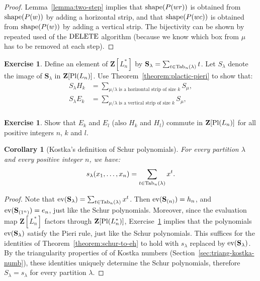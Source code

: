\documentclass[11pt]{amsproc}
\newtheorem{corollary}[theorem]{Corollary}
\theoremstyle{definition}
\theoremstyle{example}
\newtheorem{exercise}[theorem]{Exercise}
\newcommand{\ev}{\textup{ev}}
\newcommand{\del}{\textup{DELETE}}
\newcommand{\pl}{\textup{Pl}}
\newcommand{\shape}{\textup{shape}}
\newcommand{\Tab}{\textup{Tab}}
\begin{document}
\begin{proof}
  Lemma~\ref{lemma:two-step} implies that $\shape(P(wr))$ is obtained from\linebreak $\shape(P(w))$ by adding a horizontal strip, and that $\shape(P(wc))$ is obtained from $\shape(P(w))$ by adding a vertical strip.
  The bijectivity can be shown by repeated used of the $\del$ algorithm (because we know which box from $\mu$ has to be removed at each step).
\end{proof}
\begin{exercise}
  \label{exercise:plactic-pieri}
  Define an element of $\mathbf Z[L_n^*]$ by $\mathbf S_\lambda=\sum_{t\in \Tab_n(\lambda)} t$.
  Let $S_\lambda$ denote the image of $\mathbf S_\lambda$ in $\mathbf Z[\pl(L_n)]$.
  Use Theorem~\ref{theorem:plactic-pieri} to show that:
  \begin{align*}
    S_\lambda H_k&=\sum_{\mu/\lambda \text{ is a horizontal strip of size $k$}} S_\mu,\\
    S_\lambda E_k&=\sum_{\mu/\lambda \text{ is a vertical strip of size $k$}} S_\mu,\\
  \end{align*}
\end{exercise}
\begin{exercise}
  Show that $E_k$ and $E_l$ (also $H_k$ and $H_l$) commute in $\mathbf Z[\pl(L_n)]$ for all positive integers $n$, $k$ and $l$.
\end{exercise}
\begin{corollary}
  [Kostka's definition of Schur polynomials]
  \label{corollary:kostka-def-schur}
  For every partition $\lambda$ and every positive integer $n$, we have:
  \begin{displaymath}
    s_\lambda(x_1,\dotsc,x_n) = \sum_{t\in\Tab_n(\lambda)} x^t.
  \end{displaymath}
\end{corollary}
\begin{proof}
  Note that $\ev(\mathbf S_\lambda) = \sum_{t\in \Tab_n(\lambda)} x^t$.
  Then $\ev(\mathbf S_{(n)}) = h_n$, and $\ev(\mathbf S_{(1^n)}) = e_n$, just like the Schur polynomials.
  Moreover, since the evaluation map $\mathbf Z[L_n^*]$ factors through $\mathbf Z[\pl(L_n^*)]$, Exercise~\ref{exercise:plactic-pieri} implies that the polynomials $\ev(\mathbf S_\lambda)$ satisfy the Pieri rule, just like the Schur polynomials.
  This suffices for the identities of Theorem~\ref{theorem:schur-to-eh} to hold with $s_\lambda$ replaced by $\ev(\mathbf S_\lambda)$.
  By the triangularity properties of of Kostka numbers (Section~\ref{sec:triang-kostka-numb}), these identities uniquely determine the Schur polynomials, therefore $S_\lambda=s_\lambda$ for every partition $\lambda$.
\end{proof}
\end{document}
